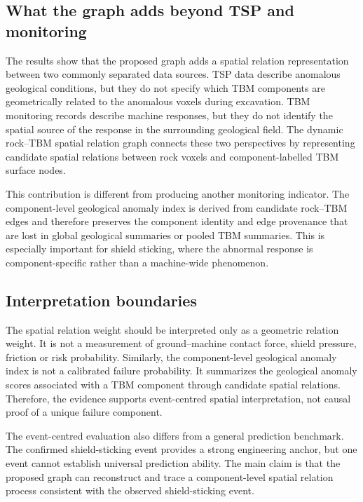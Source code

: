 \subsection{What the graph adds beyond TSP and monitoring}
\label{sec:discussion-added-value}

The results show that the proposed graph adds a spatial relation representation between two commonly separated data sources. TSP data describe anomalous geological conditions, but they do not specify which TBM components are geometrically related to the anomalous voxels during excavation. TBM monitoring records describe machine responses, but they do not identify the spatial source of the response in the surrounding geological field. The dynamic rock--TBM spatial relation graph connects these two perspectives by representing candidate spatial relations between rock voxels and component-labelled TBM surface nodes.

This contribution is different from producing another monitoring indicator. The component-level geological anomaly index is derived from candidate rock--TBM edges and therefore preserves the component identity and edge provenance that are lost in global geological summaries or pooled TBM summaries. This is especially important for shield sticking, where the abnormal response is component-specific rather than a machine-wide phenomenon.

\subsection{Interpretation boundaries}
\label{sec:discussion-boundaries}

The spatial relation weight should be interpreted only as a geometric relation weight. It is not a measurement of ground--machine contact force, shield pressure, friction or risk probability. Similarly, the component-level geological anomaly index is not a calibrated failure probability. It summarizes the geological anomaly scores associated with a TBM component through candidate spatial relations. Therefore, the evidence supports event-centred spatial interpretation, not causal proof of a unique failure component.

The event-centred evaluation also differs from a general prediction benchmark. The confirmed shield-sticking event provides a strong engineering anchor, but one event cannot establish universal prediction ability. The main claim is that the proposed graph can reconstruct and trace a component-level spatial relation process consistent with the observed shield-sticking event.

